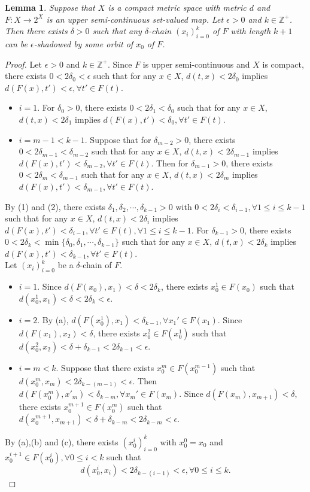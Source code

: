 \documentclass[12pt]{amsart}
\newtheorem{lemma}[theorem]{Lemma}
\theoremstyle{definition}
\begin{document}
\begin{lemma}\label{forth41}
	Suppose that $X$ is a compact metric space with metric $d$ and $F:X\rightarrow 2^X$ is an upper semi-continuous set-valued map. Let $\epsilon>0$ and $k\in\mathbb{Z^+}$. Then there exists $\delta>0$ such that any $\delta$-chain $(x_i)_{i=0}^k$ of $F$ with length $k+1$ can be $\epsilon$-shadowed by some orbit of $x_0$ of $F$.
\end{lemma}
\begin{proof}
	Let $\epsilon>0$ and $k\in\mathbb{Z^+}$. Since $F$ is upper semi-continuous and $X$ is compact, there exists $0<2\delta_0<\epsilon$ such that for any $x\in X$, $d(t,x)<2\delta_0$ implies $d(F(x),t')<\epsilon,\forall t'\in F(t)$.
	\begin{itemize}
		\item[(1)]$i=1$. For $\delta_0>0$, there exists $0<2\delta_1<\delta_0$ such that for any $x\in X$, $d(t,x)<2\delta_1$ implies $d(F(x),t')<\delta_0,\forall t'\in F(t)$.
		\item[(2)]$i=m-1<k-1$. Suppose that for $\delta_{m-2}>0$, there exists $0<2\delta_{m-1}<\delta_{m-2}$ such that for any $x\in X$, $d(t,x)<2\delta_{m-1}$ implies $d(F(x),t')<\delta_{m-2},\forall t'\in F(t)$. Then for $\delta_{m-1}>0$, there exists $0<2\delta_{m}<\delta_{m-1}$ such that for any $x\in X$, $d(t,x)<2\delta_{m}$ implies $d(F(x),t')<\delta_{m-1},\forall t'\in F(t)$.		
	\end{itemize}
	By (1) and (2), there exists $\delta_1,\delta_2,\cdots,\delta_{k-1}>0$ with $0<2\delta_i<\delta_{i-1},\forall1\leq i\leq k-1$ such that for any $x\in X$, $d(t,x)<2\delta_{i}$ implies $d(F(x),t')<\delta_{i-1},\forall t'\in F(t),\forall1\leq i\leq k-1$. For $\delta_{k-1}>0$, there exists $0<2\delta_{k}<\min\{\delta_0,\delta_1,\cdots,\delta_{k-1}\}$ such that for any $x\in X$, $d(t,x)<2\delta_{k}$ implies $d(F(x),t')<\delta_{k-1},\forall t'\in F(t)$.
	\\
	Let $(x_i)_{i=0}^k$ be a $\delta$-chain of $F$.
	\begin{itemize}
		\item [(a)]$i=1$. Since $d(F(x_0),x_1)<\delta<2\delta_{k}$, there exists $x_0^1\in F(x_0)$ such that $d(x_0^1,x_1)<\delta<2\delta_{k}<\epsilon$.
		\item[(b)]$i=2$. By (a), $d(F(x_0^1),x_1)<\delta_{k-1},\forall x_1'\in F(x_1)$. Since $d(F(x_1),x_2)<\delta$, there exists $x_0^2\in F(x_0^1)$ such that $d(x_0^2,x_2)<\delta+\delta_{k-1}<2\delta_{k-1}<\epsilon$.
		\item[(c)]$i=m<k$. Suppose that there exists $x_0^m\in F(x_0^{m-1})$ such that $d(x_0^m,x_m)<2\delta_{k-(m-1)}<\epsilon$. Then $d(F(x_0^m),x'_m)<\delta_{k-m},\forall x_m'\in F(x_m)$. Since $d(F(x_m),x_{m+1})<\delta$, there exists $x_0^{m+1}\in F(x_0^m)$ such that $d(x_0^{m+1},x_{m+1})<\delta+\delta_{k-m}<2\delta_{k-m}<\epsilon$.
	\end{itemize}
	By (a),(b) and (c), there exists $(x_0^i)_{i=0}^k$ with $x_0^0=x_0$ and $x_0^{i+1}\in F(x_0^i),\forall 0\leq i<k$ such that $$d(x_0^i,x_i)<2\delta_{k-(i-1)}<\epsilon,\forall  0\leq i\leq k.$$
\end{proof}
\end{document}
